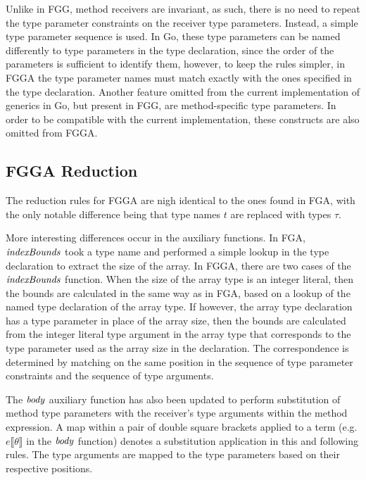 Unlike in FGG, method receivers are invariant, as such, there is no need to
repeat the type parameter constraints on the receiver type parameters. Instead,
a simple type parameter sequence is used. In Go, these type parameters can be
named differently to type parameters in the type declaration, since the order of
the parameters is sufficient to identify them, however, to keep the rules
simpler, in FGGA the type parameter names must match exactly with the ones
specified in the type declaration. Another feature omitted from the current
implementation of generics in Go, but present in FGG, are method-specific type
parameters. In order to be compatible with the current implementation, these
constructs are also omitted from FGGA.



\subsection{FGGA Reduction}

The reduction rules for FGGA are nigh identical to the ones found in FGA, with
the only notable difference being that type names $t$ are replaced with types
$\tau$.

More interesting differences occur in the auxiliary functions. In FGA,
$\mathit{indexBounds}$ took a type name and performed a simple lookup in the type
declaration to extract the size of the array. In FGGA, there are two cases of
the $\mathit{indexBounds}$ function. When the size of the array type is an integer
literal, then the bounds are calculated in the same way as in FGA, based on a
lookup of the named type declaration of the array type. If however, the array
type declaration has a type parameter in place of the array size, then the
bounds are calculated from the integer literal type argument in the array type
that corresponds to the type parameter used as the array size in the
declaration. The correspondence is determined by matching on the same position
in the sequence of type parameter constraints and the sequence of type
arguments.

The $\mathit{body}$ auxiliary function has also been updated to perform substitution of
method type parameters with the receiver's type arguments within the method
expression. A map within a pair of double square brackets applied to a term
(e.g. $e\llbracket\theta\rrbracket$ in the $\mathit{body}$ function) denotes a
substitution application in this and following rules. The type arguments are
mapped to the type parameters based on their respective positions.

